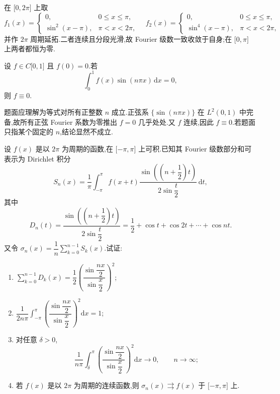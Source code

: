 \begin{solution}
    在 $\lbrack0,2\pi\rbrack$ 上取
    \[
        f_1(x)=\begin{cases}0, & 0\leq x\leq\pi, \\ \sin^2(x-\pi),&\pi<x<2\pi,
        \end{cases}
        \quad
        f_2(x)=\begin{cases}0, & 0\leq x\leq\pi, \\ \sin^4(x-\pi),&\pi<x<2\pi,
        \end{cases}
    \]
    并作 $2\pi$ 周期延拓.二者连续且分段光滑,故 Fourier 级数一致收敛于自身;在 $\lbrack0,\pi\rbrack$ 上两者都恒为零.
\end{solution}

\begin{example}
    设 $f\in C\lbrack 0,1\rbrack$ 且 $f(0)=0$.若
    \[
        \int_0^1f(x)\sin(n\pi x)\,\mathrm{d}x=0,
    \]
    则 $f\equiv0$.
\end{example}
\exampleblank

\begin{solution}
    题面应理解为等式对所有正整数 $n$ 成立.正弦系 $\{\sin(n\pi x)\}$ 在 $L^2(0,1)$ 中完备,故所有正弦 Fourier 系数为零推出 $f=0$ 几乎处处.又 $f$ 连续,因此 $f\equiv0$.若题面只指某个固定的 $n$,结论显然不成立.
\end{solution}

\begin{example}
    设 $f(x)$ 是以 $2\pi$ 为周期的函数,在 $\lbrack -\pi,\pi\rbrack$ 上可积.已知其 Fourier 级数部分和可表示为 Dirichlet 积分
    \[
        S_n(x)=\dfrac{1}{\pi}\int_{-\pi}^{\pi}f(x+t)
        \dfrac{\sin\left((n+\dfrac{1}{2})t\right)}{2\sin\dfrac{t}{2}}\,\mathrm{d}t,
    \]
    其中
    \[
        D_n(t)=\dfrac{\sin\left((n+\dfrac{1}{2})t\right)}{2\sin\dfrac{t}{2}}
        =\dfrac{1}{2}+\cos t+\cos2t+\cdots+\cos nt.
    \]
    又令 $\displaystyle\sigma_n(x)=\dfrac{1}{n}\sum\limits_{k=0}^{n-1}S_k(x)$.试证:
    \begin{enumerate}
        \item $\displaystyle\sum\limits_{k=0}^{n-1}D_k(x)=\dfrac{1}{2}\left(\dfrac{\sin\dfrac{nx}{2}}{\sin\dfrac{x}{2}}\right)^2$;
        \item $\displaystyle\dfrac{1}{2n\pi}\int_{-\pi}^{\pi}\left(\dfrac{\sin\dfrac{nx}{2}}{\sin\dfrac{x}{2}}\right)^2\mathrm{d}x=1$;
        \item 对任意 $\delta>0$,
              \[
                  \dfrac{1}{n\pi}\int_{\delta}^{\pi}\left(\dfrac{\sin\dfrac{nx}{2}}{\sin\dfrac{x}{2}}\right)^2\mathrm{d}x\to0,
                  \qquad n\to\infty;
              \]
        \item 若 $f(x)$ 是以 $2\pi$ 为周期的连续函数,则 $\sigma_n(x)\rightrightarrows f(x)$ 于 $\lbrack -\pi,\pi\rbrack$ 上.
    \end{enumerate}
\end{example}
\exampleblank

